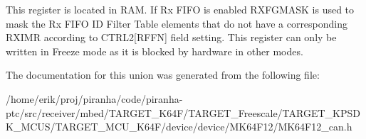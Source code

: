 This register is located in R\+AM. If Rx F\+I\+FO is enabled R\+X\+F\+G\+M\+A\+SK is used to mask the Rx F\+I\+FO ID Filter Table elements that do not have a corresponding R\+X\+I\+MR according to C\+T\+R\+L2\mbox{[}R\+F\+FN\mbox{]} field setting. This register can only be written in Freeze mode as it is blocked by hardware in other modes. 

The documentation for this union was generated from the following file\+:\begin{DoxyCompactItemize}
\item 
/home/erik/proj/piranha/code/piranha-\/ptc/src/receiver/mbed/\+T\+A\+R\+G\+E\+T\+\_\+\+K64\+F/\+T\+A\+R\+G\+E\+T\+\_\+\+Freescale/\+T\+A\+R\+G\+E\+T\+\_\+\+K\+P\+S\+D\+K\+\_\+\+M\+C\+U\+S/\+T\+A\+R\+G\+E\+T\+\_\+\+M\+C\+U\+\_\+\+K64\+F/device/device/\+M\+K64\+F12/M\+K64\+F12\+\_\+can.\+h\end{DoxyCompactItemize}
